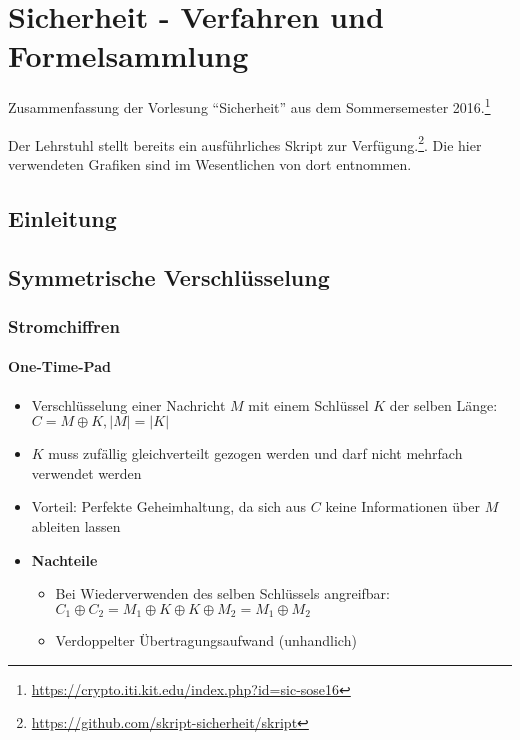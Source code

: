 
\chapter{Sicherheit - Verfahren und Formelsammlung}

Zusammenfassung der Vorlesung "`Sicherheit"' aus dem Sommersemester 2016.\footnote{\url{https://crypto.iti.kit.edu/index.php?id=sic-sose16}}

Der Lehrstuhl stellt bereits ein ausführliches Skript zur Verfügung.\footnote{\url{https://github.com/skript-sicherheit/skript}}. Die hier verwendeten Grafiken sind im Wesentlichen von dort entnommen.

\section{Einleitung}



\section{Symmetrische Verschlüsselung}

\subsection{Stromchiffren}

\subsubsection{One-Time-Pad}
\begin{itemize}
	\item Verschlüsselung einer Nachricht \(M\) mit einem Schlüssel \(K\) der selben Länge: \(C = M \oplus K, |M| = |K|\)
	\item \(K\) muss zufällig gleichverteilt gezogen werden und darf nicht mehrfach verwendet werden
	\item Vorteil: Perfekte Geheimhaltung, da sich aus \(C\) keine Informationen über \(M\) ableiten lassen
	\item \textbf{Nachteile}
	\begin{itemize}
		\item Bei Wiederverwenden des selben Schlüssels angreifbar: \(C_1 \oplus C_2 = M_1 \oplus K \oplus K \oplus M_2 = M_1 \oplus M_2\)
		\item Verdoppelter Übertragungsaufwand (unhandlich)
	\end{itemize}
\end{itemize}


